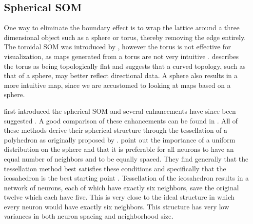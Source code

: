 \documentclass[10pt,titlepage]{article}
\begin{document}
\subsection{Spherical SOM}
One way to eliminate the boundary effect is to wrap the lattice around a three
dimensional object such as a sphere or torus, thereby removing the edge
entirely. The toroidal SOM was introduced by \cite{li1993}, however the torus is
not effective for visualization, as maps generated from a torus are not
very intuitive \citep{ito2000,wu2006}.  \cite{ritter99} describes the torus as
being topologically flat and suggests that a curved topology, such as that of a
sphere, may better reflect directional data.  A sphere also results in a more
intuitive map, since we are accustomed to looking at maps based on a sphere.

\cite{ritter99} first introduced the spherical SOM and several enhancements have
since been suggested \citep{boudjemai2003,sangole03,Nishio:2006fk,wu2006}.  A
good comparison of these enhancements can be found in \cite{wu2006}.  All of
these methods derive their spherical structure through the tessellation of a
polyhedron as originally proposed by \cite{ritter99}.  \cite{wu2006} point
out the importance of a uniform distribution on the sphere and that it is
preferable for all neurons to have an equal number of neighbors and to be
equally spaced.  They find generally that the tessellation method best satisfies
these conditions and specifically that the icosahedron is the best starting
point \citep{wu2005}. Tessellation of the icosahedron results in a network of
neurons, each of which have exactly six neighbors, save the original twelve
which each have five.  This is very close to the ideal structure in which every
neuron would have exactly six neighbors.  This structure has very low variances
in both neuron spacing and neighborhood size.
\end{document}

